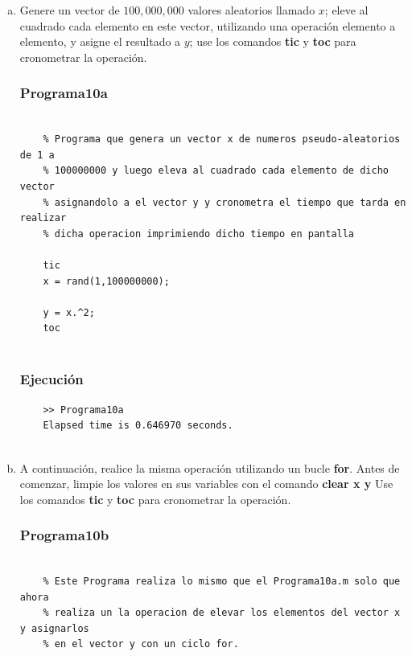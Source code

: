 \documentclass{article}
\begin{document}
	\begin{enumerate}[a)]
	\item Genere un vector de $100,000,000$ valores aleatorios llamado $x$; eleve al cuadrado cada elemento en este vector, utilizando una operación elemento a elemento, y asigne el resultado a $y$; use los comandos \textbf{tic} y \textbf{toc} para cronometrar la operación.
	
	\subsubsection{Programa10a}
	
	\begin{lstlisting}
		
	% Programa que genera un vector x de numeros pseudo-aleatorios de 1 a 
	% 100000000 y luego eleva al cuadrado cada elemento de dicho vector
	% asignandolo a el vector y y cronometra el tiempo que tarda en realizar
	% dicha operacion imprimiendo dicho tiempo en pantalla
	
	tic
	x = rand(1,100000000);
	
	y = x.^2;
	toc
	
	\end{lstlisting}
	
	\subsubsection{Ejecución}
	
	\begin{lstlisting}
	>> Programa10a
	Elapsed time is 0.646970 seconds.
	
	\end{lstlisting}
	
	\item A continuación, realice la misma operación utilizando un bucle \textbf{for}. Antes de comenzar, limpie los valores en sus variables con el comando \textbf{clear x y}
	Use los comandos \textbf{tic} y \textbf{toc} para cronometrar la operación.
	
	\subsubsection{Programa10b}
	
	\begin{lstlisting}
		
	% Este Programa realiza lo mismo que el Programa10a.m solo que ahora
	% realiza un la operacion de elevar los elementos del vector x y asignarlos
	% en el vector y con un ciclo for.
	

\end{lstlisting}
\end{enumerate}
\end{document}
